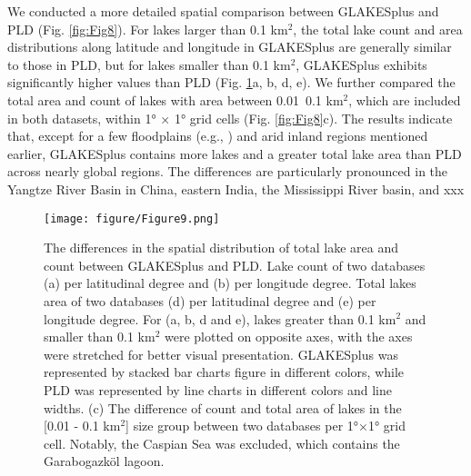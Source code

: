 \documentclass[preprint,12pt,authoryear]{elsarticle}
\begin{document}
We conducted a more detailed spatial comparison between GLAKESplus and PLD (Fig. \ref{fig:Fig8}). For lakes larger than 0.1 km$^2$, the total lake count and area distributions along latitude and longitude in GLAKESplus are generally similar to those in PLD, but for lakes smaller than 0.1 km$^2$, GLAKESplus exhibits significantly higher values than PLD (Fig. \ref{fig:Fig9}a, b, d, e). We further compared the total area and count of lakes with area between 0.01~0.1 km$^2$, which are included in both datasets, within 1° × 1° grid cells (Fig. \ref{fig:Fig8}c). The results indicate that, except for a few floodplains (e.g., ) and arid inland regions mentioned earlier, GLAKESplus contains more lakes and a greater total lake area than PLD across nearly global regions. The differences are particularly pronounced in the Yangtze River Basin in China, eastern India, the Mississippi River basin, and xxx 

\begin{figure}[t]
    \centering
    \texttt{[image: figure/Figure9.png]}
    \caption{The differences in the spatial distribution of total lake area and count between GLAKESplus and PLD. Lake count of two databases (a) per latitudinal degree and (b) per longitude degree. Total lakes area of two databases (d) per latitudinal degree and (e) per longitude degree. For (a, b, d and e), lakes greater than 0.1 km$^2$ and smaller than 0.1 km$^2$ were plotted on opposite axes, with the axes were stretched for better visual presentation. GLAKESplus was represented by stacked bar charts figure in different colors, while PLD was represented by line charts in different colors and line widths. (c) The difference of count and total area of lakes in the [0.01 - 0.1 km$^2$] size group between two databases per 1°×1° grid cell. Notably, the Caspian Sea was excluded, which contains the Garabogazköl lagoon.}
    \label{fig:Fig9}
\end{figure}
\end{document}
